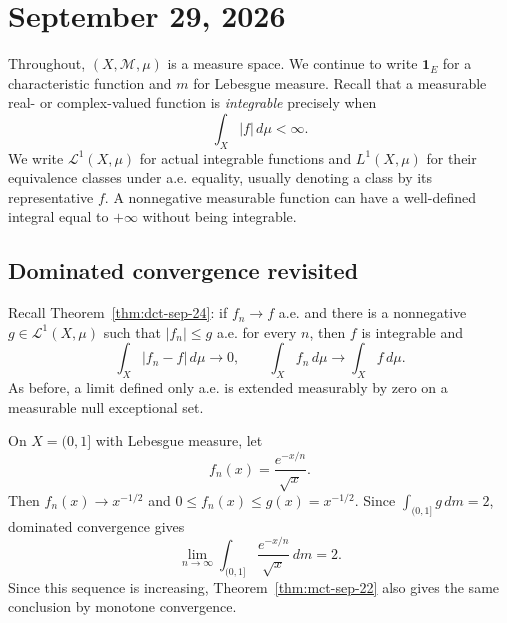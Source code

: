 \section{September 29, 2026}

Throughout, $(X,\mathcal M,\mu)$ is a measure space. We continue to
write $\mathbf 1_E$ for a characteristic function and $m$ for Lebesgue
measure. Recall that a measurable real- or complex-valued function is
\emph{integrable} precisely when
\[
  \int_X|f|\,d\mu<\infty.
\]
We write $\mathcal L^1(X,\mu)$ for actual integrable functions and
$L^1(X,\mu)$ for their equivalence classes under a.e. equality, usually
denoting a class by its representative $f$. A nonnegative measurable
function can have a well-defined integral equal to $+\infty$ without
being integrable.

\subsection{Dominated convergence revisited}

Recall Theorem~\ref{thm:dct-sep-24}: if $f_n\to f$ a.e. and there is
a nonnegative $g\in\mathcal L^1(X,\mu)$ such that $|f_n|\leq g$ a.e.
for every $n$, then $f$ is integrable and
\[
  \int_X|f_n-f|\,d\mu\longrightarrow0,
  \qquad
  \int_X f_n\,d\mu\longrightarrow\int_X f\,d\mu.
\]
As before, a limit defined only a.e. is extended measurably by zero on
a measurable null exceptional set.

\begin{example}
  On $X=(0,1]$ with Lebesgue measure, let
  \[
    f_n(x)=\frac{e^{-x/n}}{\sqrt{x}}.
  \]
  Then $f_n(x)\to x^{-1/2}$ and
  $0\leq f_n(x)\leq g(x)=x^{-1/2}$. Since
  $\int_{(0,1]}g\,dm=2$, dominated convergence gives
  \[
    \lim_{n\to\infty}\int_{(0,1]}
      \frac{e^{-x/n}}{\sqrt{x}}\,dm=2.
  \]
  Since this sequence is increasing, Theorem~\ref{thm:mct-sep-22}
  also gives the same conclusion by monotone convergence.
\end{example}


